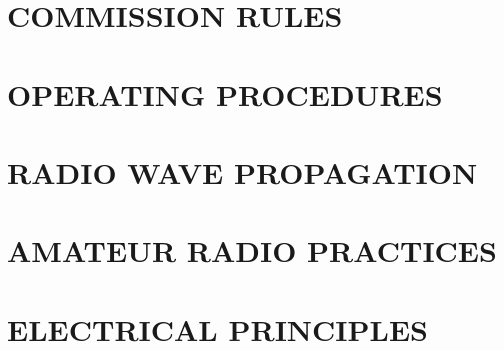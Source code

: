 \documentclass[12pt]{book}
\begin{document}
\tableofcontents
\newpage
\chapter{COMMISSION RULES}
\label{chapter:commission_rules}






\chapter{OPERATING PROCEDURES}
\label{chapter:operating_procedures}





\chapter{RADIO WAVE PROPAGATION}
\label{chapter:radio_wave_propagation}



\chapter{AMATEUR RADIO PRACTICES}
\label{chapter:amateur_radio_practices}




\chapter{ELECTRICAL PRINCIPLES}
\label{chapter:electrical_principles}








\end{document}
